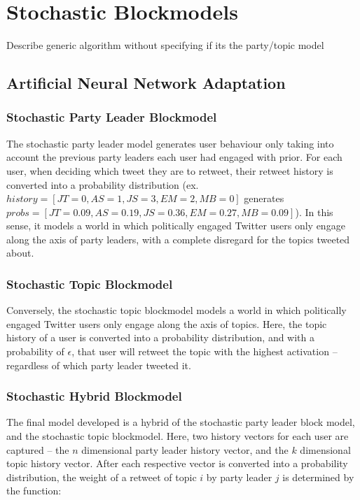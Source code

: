 \section{Stochastic Blockmodels}\label{sec:SBMs}

Describe generic algorithm without specifying if its the party/topic model

\subsection{Artificial Neural Network Adaptation}\label{sec:ANNAdaptation}

\subsubsection{Stochastic Party Leader Blockmodel}\label{sec:SPLBM}

The stochastic party leader model generates user behaviour only taking into
account the previous party leaders each user had engaged with prior. For each
user, when deciding which tweet they are to retweet, their retweet history is
converted into a probability distribution (ex.\
$history=[JT=0,AS=1,JS=3,EM=2,MB=0]$ generates
$probs=[JT=0.09,AS=0.19,JS=0.36,EM=0.27,MB=0.09]$). In this sense, it models a world
in which politically engaged Twitter users only engage along the axis of party
leaders, with a complete disregard for the topics tweeted about.

\subsubsection{Stochastic Topic Blockmodel}\label{sec:STBM}

Conversely, the stochastic topic blockmodel models a world in which politically
engaged Twitter users only engage along the axis of topics. Here, the topic
history of a user is converted into a probability distribution, and with a
probability of $\epsilon$, that user will retweet the topic with the highest
activation -- regardless of which party leader tweeted it. 

\subsubsection{Stochastic Hybrid Blockmodel}\label{sec:SHBM}

The final model developed is a hybrid of the stochastic party leader block
model, and the stochastic topic blockmodel. Here, two history vectors for each
user are captured -- the $n$ dimensional party leader history vector, and the
$k$ dimensional topic history vector. After each respective vector is converted
into a probability distribution, the weight of a retweet of
topic $i$ by party leader $j$ is determined by the function:

